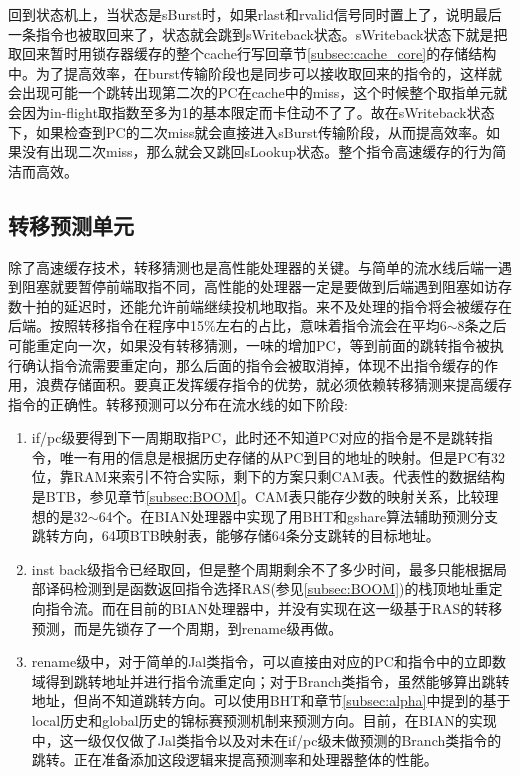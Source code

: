 回到状态机上，当状态是sBurst时，如果rlast和rvalid信号同时置上了，说明最后一条指令也被取回来了，状态就会跳到sWriteback状态。sWriteback状态下就是把取回来暂时用锁存器缓存的整个cache行写回章节\ref{subsec:cache_core}的存储结构中。为了提高效率，在burst传输阶段也是同步可以接收取回来的指令的，这样就会出现可能一个跳转出现第二次的PC在cache中的miss，这个时候整个取指单元就会因为in-flight取指数至多为1的基本限定而卡住动不了了。故在sWriteback状态下，如果检查到PC的二次miss就会直接进入sBurst传输阶段，从而提高效率。如果没有出现二次miss，那么就会又跳回sLookup状态。整个指令高速缓存的行为简洁而高效。

\subsection{转移预测单元}
除了高速缓存技术，转移猜测也是高性能处理器的关键。与简单的流水线后端一遇到阻塞就要暂停前端取指不同，高性能的处理器一定是要做到后端遇到阻塞如访存数十拍的延迟时，还能允许前端继续投机地取指。来不及处理的指令将会被缓存在后端。按照转移指令在程序中15\%左右的占比，意味着指令流会在平均6$ \sim $8条之后可能重定向一次，如果没有转移猜测，一味的增加PC，等到前面的跳转指令被执行确认指令流需要重定向，那么后面的指令会被取消掉，体现不出指令缓存的作用，浪费存储面积。要真正发挥缓存指令的优势，就必须依赖转移猜测来提高缓存指令的正确性。转移预测可以分布在流水线的如下阶段:
\begin{enumerate}[label=(\alph*)]
	\item if/pc级要得到下一周期取指PC，此时还不知道PC对应的指令是不是跳转指令，唯一有用的信息是根据历史存储的从PC到目的地址的映射。但是PC有32位，靠RAM来索引不符合实际，剩下的方案只剩CAM表。代表性的数据结构是BTB，参见章节\ref{subsec:BOOM}。CAM表只能存少数的映射关系，比较理想的是32$ \sim $64个。在BIAN处理器中实现了用BHT和gshare算法辅助预测分支跳转方向，64项BTB映射表，能够存储64条分支跳转的目标地址。
	\item inst back级指令已经取回，但是整个周期剩余不了多少时间，最多只能根据局部译码检测到是函数返回指令选择RAS(参见\ref{subsec:BOOM})的栈顶地址重定向指令流。而在目前的BIAN处理器中，并没有实现在这一级基于RAS的转移预测，而是先锁存了一个周期，到rename级再做。
	\item rename级中，对于简单的Jal类指令，可以直接由对应的PC和指令中的立即数域得到跳转地址并进行指令流重定向；对于Branch类指令，虽然能够算出跳转地址，但尚不知道跳转方向。可以使用BHT和章节\ref{subsec:alpha}中提到的基于local历史和global历史的锦标赛预测机制来预测方向。目前，在BIAN的实现中，这一级仅仅做了Jal类指令以及对未在if/pc级未做预测的Branch类指令的跳转。正在准备添加这段逻辑来提高预测率和处理器整体的性能。
\end{enumerate}

